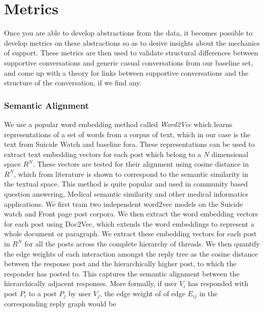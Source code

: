 \section{Metrics}

Once you are able to develop abstractions from the data, it becomes possible to develop metrics on these abstractions so as to derive insights about the mechanics of support. These metrics are then used to validate structural differences between supportive conversations and generic casual conversations from our baseline set, and come up with a theory for links between supportive conversations and the structure of the conversation, if we find any.



\subsubsection{Semantic Alignment}
\label{Sec:Semantic}
We use a popular word embedding method called \textit{Word2Vec} \cite{mikolov2013distributed} which learns representations of a set of words from a corpus of text, which in our case is the text from Suicide Watch and baseline fora. These representations can be used to extract text embedding vectors for each post which belong to a $N$ dimensional space $R^N$. These vectors are tested for their alignment using cosine distance in $R^N$, which from literature is shown to correspond to the semantic similarity in the textual space. This method is quite popular and used in community based question answering\cite{mihaylov2016semanticz}, Medical semantic similarity \cite{de2014medical} and other medical informatics applications\cite{zhu2017semantic}.
We first train two independent word2vec models on the Suicide watch and Front page post corpora. 
We then extract the word embedding vectors for each post using Doc2Vec\cite{le2014distributed}, which extends the word embeddings to represent a whole document or paragraph. We extract these embedding vectors for each post in $R^N$ for all the posts across the complete hierarchy of threads. We then quantify the edge weights of each interaction amongst the reply tree as the cosine distance between the response post and the hierarchically higher post, to which the responder has posted to. This captures the semantic alignment between the hierarchically adjacent responses. 
More formally, if user $V_i$ has responded with post $P_i$ to a post $P_j$ by user $V_j$, the edge weight of of edge $E_{ij}$ in the corresponding reply graph would be

